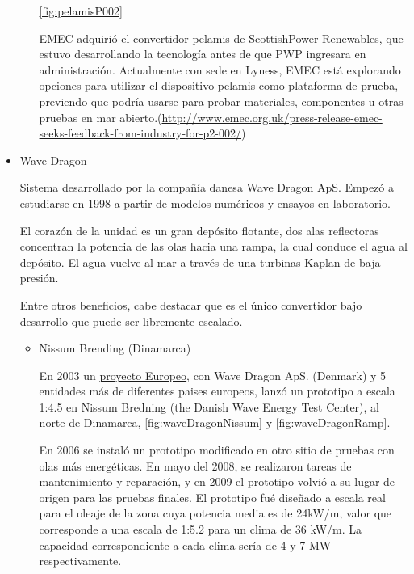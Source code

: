\begin{itemize}
\begin{itemize}
    \autoref{fig:pelamisP002}

    EMEC adquirió el convertidor pelamis de ScottishPower Renewables,
    que estuvo desarrollando la tecnología antes de que PWP ingresara en
    administración. Actualmente con sede en Lyness, EMEC está explorando
    opciones para utilizar el dispositivo pelamis como plataforma de
    prueba, previendo que podría usarse para probar materiales,
    componentes u otras pruebas en mar
    abierto.(\url{http://www.emec.org.uk/press-release-emec-seeks-feedback-from-industry-for-p2-002/})
  \end{itemize}
\item
  Wave Dragon

  Sistema desarrollado por la compañía danesa Wave Dragon ApS. Empezó a
  estudiarse en 1998 a partir de modelos numéricos y ensayos en
  laboratorio.

  El corazón de la unidad es un gran depósito flotante, dos alas
  reflectoras concentran la potencia de las olas hacia una rampa, la
  cual conduce el agua al depósito. El agua vuelve al mar a través de
  una turbinas Kaplan de baja presión.

  Entre otros beneficios, cabe destacar que es el único convertidor bajo
  desarrollo que puede ser libremente escalado.

  \begin{itemize}
  \item
    Nissum Brending (Dinamarca)

    En 2003 un
    \href{\%5Bhttp://www.wavedragon.net/sea-testing-and-optimisation-of-power-production-on-a-scale-14-5-test-rig-of-the-offshore-wave-energy-converter-wave-dragon/}{proyecto
    Europeo}, con Wave Dragon ApS. (Denmark) y 5 entidades más de
    diferentes paises europeos, lanzó un prototipo a escala 1:4.5 en
    Nissum Bredning (the Danish Wave Energy Test Center), al norte de
    Dinamarca, \autoref{fig:waveDragonNissum} y \autoref{fig:waveDragonRamp}.

    En 2006 se instaló un prototipo modificado en otro sitio de pruebas
    con olas más energéticas. En mayo del 2008, se realizaron tareas de
    mantenimiento y reparación, y en 2009 el prototipo volvió a su lugar
    de origen para las pruebas finales. El prototipo fué diseñado a
    escala real para el oleaje de la zona cuya potencia media es de
    24kW/m, valor que corresponde a una escala de 1:5.2 para un clima de
    36 kW/m. La capacidad correspondiente a cada clima sería de 4 y 7 MW
    respectivamente.





\end{itemize}
\end{itemize}
